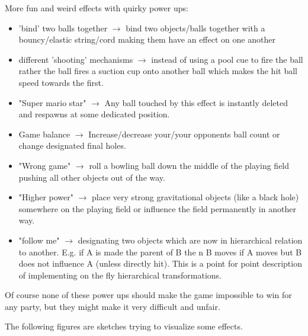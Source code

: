 \documentclass{article}
\begin{document}
More fun and weird effects with quirky power ups:
\begin{itemize}
\item 'bind' two balls together  $\rightarrow$ bind two objects/balls together with a bouncy/elastic string/cord making them have an effect on one another
\item different 'shooting' mechanisms  $\rightarrow$ instead of using a pool cue to fire the ball rather the ball fires a suction cup onto another ball which makes the hit ball speed towards the first.
\item "Super mario star" $\rightarrow$ Any ball touched by this effect is instantly deleted and respawns at some dedicated position.
\item Game balance $\rightarrow$ Increase/decrease your/your opponents ball count or change designated final holes.
\item "Wrong game" $\rightarrow$ roll a bowling ball down the middle of the playing field pushing all other objects out of the way.
\item "Higher power" $\rightarrow$ place very strong gravitational objects (like a black hole) somewhere on the playing field or influence the field permanently in another way.
\item "follow me" $\rightarrow$ designating two objects which are now in hierarchical relation to another. E.g. if A is made the parent of B the n B moves if A moves but B does not influence A (unless directly hit). This is a point for point description of implementing on the fly hierarchical transformations.
\end{itemize}

Of course none of these power ups should make the game impossible to win for any party, but they might make it very difficult and unfair.

The following figures are sketches trying to visualize some effects.
\end{document}
